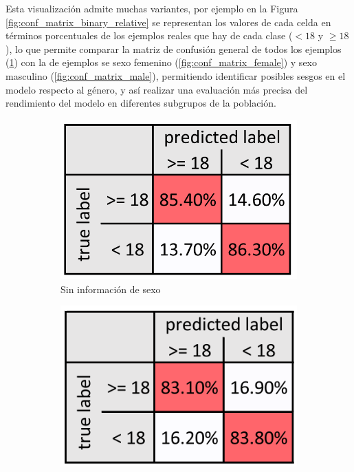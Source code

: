 \begin{itemize}
    Esta visualización admite muchas variantes, por ejemplo en la Figura \ref{fig:conf_matrix_binary_relative}
    se representan los valores de cada celda en términos porcentuales de los ejemplos reales que hay de cada clase 
    ($< 18$ y $\ge 18$), lo que permite comparar la matriz de confusión general de todos los ejemplos 
    (\ref{fig:conf_matrix_general}) con la de ejemplos se sexo femenino (\ref{fig:conf_matrix_female}) y 
    sexo masculino (\ref{fig:conf_matrix_male}), permitiendo identificar posibles sesgos en el modelo respecto 
    al género, y así realizar una evaluación más precisa del rendimiento del modelo en diferentes subgrupos de
    la población.
    
    \begin{figure}[h]
        \centering
    
        \begin{subfigure}[b]{0.3\textwidth}
            \centering
            \includegraphics[width=\textwidth]{capitulos/cap_02/imagenes/confusion_matrix_binary_1.png}
            \caption{Sin información de sexo}
            \label{fig:conf_matrix_general}
        \end{subfigure}
        \hfill
        \begin{subfigure}[b]{0.3\textwidth}
            \centering
            \includegraphics[width=\textwidth]{capitulos/cap_02/imagenes/confusion_matrix_binary_2.png}

\end{subfigure}
\end{figure}
\end{itemize}
